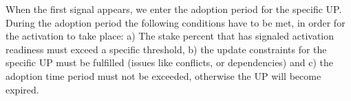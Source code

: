 When the first signal appears, we enter the adoption period for the specific UP. During the adoption period the following conditions have to be met, in order for the activation to take place: a) The stake percent that has signaled activation readiness must exceed a specific threshold, b) the update constraints for the specific UP must be fulfilled (issues like conflicts, or dependencies) and c) the adoption time period must not be exceeded, otherwise the UP will become expired. 


